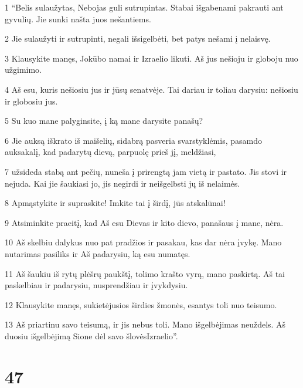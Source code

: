 \par 1 “Belis sulaužytas, Nebojas guli sutrupintas. Stabai išgabenami pakrauti ant gyvulių. Jie sunki našta juos nešantiems. 
\par 2 Jie sulaužyti ir sutrupinti, negali išsigelbėti, bet patys nešami į nelaisvę. 
\par 3 Klausykite manęs, Jokūbo namai ir Izraelio likuti. Aš jus nešioju ir globoju nuo užgimimo. 
\par 4 Aš esu, kuris nešiosiu jus ir jūsų senatvėje. Tai dariau ir toliau darysiu: nešiosiu ir globosiu jus. 
\par 5 Su kuo mane palyginsite, į ką mane darysite panašų? 
\par 6 Jie auksą iškrato iš maišelių, sidabrą pasveria svarstyklėmis, pasamdo auksakalį, kad padarytų dievą, parpuolę prieš jį, meldžiasi, 
\par 7 užsideda stabą ant pečių, nuneša į prirengtą jam vietą ir pastato. Jis stovi ir nejuda. Kai jie šaukiasi jo, jis negirdi ir neišgelbsti jų iš nelaimės. 
\par 8 Apmąstykite ir supraskite! Imkite tai į širdį, jūs atskalūnai! 
\par 9 Atsiminkite praeitį, kad Aš esu Dievas ir kito dievo, panašaus į mane, nėra. 
\par 10 Aš skelbiu dalykus nuo pat pradžios ir pasakau, kas dar nėra įvykę. Mano nutarimas pasiliks ir Aš padarysiu, ką esu numatęs. 
\par 11 Aš šaukiu iš rytų plėšrų paukštį, tolimo krašto vyrą, mano paskirtą. Aš tai paskelbiau ir padarysiu, nusprendžiau ir įvykdysiu. 
\par 12 Klausykite manęs, sukietėjusios širdies žmonės, esantys toli nuo teisumo. 
\par 13 Aš priartinu savo teisumą, ir jis nebus toli. Mano išgelbėjimas neuždels. Aš duosiu išgelbėjimą Sione dėl savo šlovės­Izraelio”.



\chapter{47}


